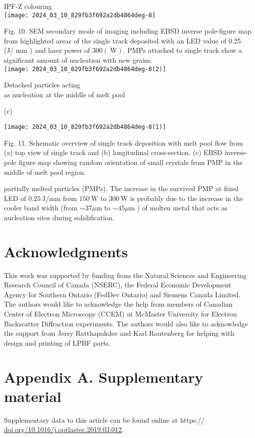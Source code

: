 \documentclass[10pt]{article}
\begin{document}
IPF-Z colouring\\
\texttt{[image: 2024\_03\_10\_829fb3f692a2db4864deg-8]}

Fig. 10. SEM secondary mode of imaging including EBSD inverse pole-figure map from highlighted areas of the single track deposited with an LED value of 0.25 (J/ $\mathrm{mm}$ ) and laser power of $300(\mathrm{~W})$. PMPs attached to single track show a significant amount of nucleation with new grains.\\
\texttt{[image: 2024\_03\_10\_829fb3f692a2db4864deg-8(2)]}

Detached particles acting\\
as nucleation at the middle of melt pool

(c)

\begin{center}
\texttt{[image: 2024\_03\_10\_829fb3f692a2db4864deg-8(1)]}
\end{center}

Fig. 11. Schematic overview of single track deposition with melt pool flow from (a) top view of single track and (b) longitudinal cross-section. (c) EBSD inverse-pole figure map showing random orientation of small crystals from PMP in the middle of melt pool region.

partially melted particles (PMPs). The increase in the survived PMP at fixed LED of $0.25 \mathrm{~J} / \mathrm{mm}$ from $150 \mathrm{~W}$ to $300 \mathrm{~W}$ is probably due to the increase in the cooler band width (from $\sim 37 \mu \mathrm{m}$ to $\sim 45 \mu \mathrm{m}$ ) of molten metal that acts as nucleation sites during solidification.

\section*{Acknowledgments}
This work was supported by funding from the Natural Sciences and Engineering Research Council of Canada (NSERC), the Federal Economic Development Agency for Southern Ontario (FedDev Ontario) and Siemens Canada Limited. The authors would like to acknowledge the help from members of Canadian Center of Electron Microscopy (CCEM) at McMaster University for Electron Backscatter Diffraction experiments. The authors would also like to acknowledge the support from Jerry Ratthapakdee and Karl Rautenberg for helping with design and printing of LPBF parts.

\section*{Appendix A. Supplementary material}
Supplementary data to this article can be found online at https:// \href{http://doi.org/10.1016/j.optlastec.2019.03.012}{doi.org/10.1016/j.optlastec.2019.03.012}.
\end{document}
